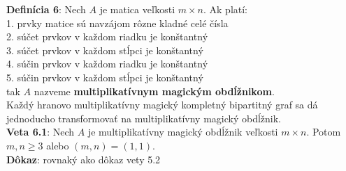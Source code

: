 \documentclass[12pt]{article}
\begin{document}
\textbf{Definícia 6}: Nech $A$ je matica veľkosti $m \times n$. Ak platí: \\
1. prvky matice sú navzájom rôzne kladné celé čísla \\
2. súčet prvkov v každom riadku je konštantný \\
3. súčet prvkov v každom stĺpci je konštantný \\
4. súčin prvkov v každom riadku je konštantný \\
5. súčin prvkov v každom stĺpci je konštantný \\
tak $A$ nazveme \textbf{multiplikatívnym magickým obdĺžnikom}. \\

Každý hranovo multiplikatívny magický kompletný bipartitný graf sa dá jednoducho transformovať na multiplikatívny magický obdĺžnik. \\

\textbf{Veta 6.1}: Nech $A$ je multiplikatívny magický obdĺžnik veľkosti $m \times n$. Potom $m,n \geq 3$ alebo $(m, n) = (1, 1)$. \\

\textbf{Dôkaz}: rovnaký ako dôkaz vety 5.2
\end{document}
